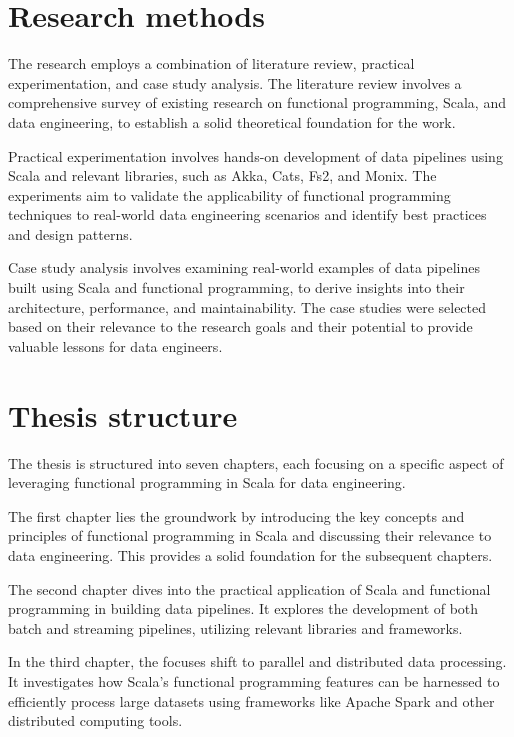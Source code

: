 \section*{Research methods}

The research employs a combination of literature review, practical experimentation, and case study analysis. The literature review involves a comprehensive survey of existing research on functional programming, Scala, and data engineering, to establish a solid theoretical foundation for the work.

Practical experimentation involves hands-on development of data pipelines using Scala and relevant libraries, such as Akka, Cats, Fs2, and Monix. The experiments aim to validate the applicability of functional programming techniques to real-world data engineering scenarios and identify best practices and design patterns.

Case study analysis involves examining real-world examples of data pipelines built using Scala and functional programming, to derive insights into their architecture, performance, and maintainability. The case studies were selected based on their relevance to the research goals and their potential to provide valuable lessons for data engineers.

\section*{Thesis structure}

The thesis is structured into seven chapters, each focusing on a specific aspect of leveraging functional programming in Scala for data engineering.

The first chapter lies the groundwork by introducing the key concepts and principles of functional programming in Scala and discussing their relevance to data engineering. This provides a solid foundation for the subsequent chapters.

The second chapter dives into the practical application of Scala and functional programming in building data pipelines. It explores the development of both batch and streaming pipelines, utilizing relevant libraries and frameworks. 

In the third chapter, the focuses shift to parallel and distributed data processing. It investigates how Scala's functional programming features can be harnessed to efficiently process large datasets using frameworks like Apache Spark and other distributed computing tools.

